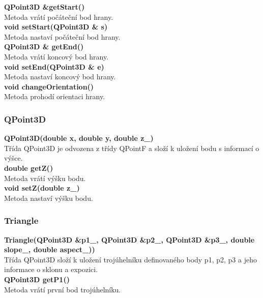 \documentclass[a4paper,11pt,twoside]{article}
\begin{document}
\noindent\textbf{QPoint3D \&getStart()}\\
Metoda vrátí počáteční bod hrany.\\

\noindent\textbf{void setStart(QPoint3D \& s)}\\
Metoda nastaví počáteční bod hrany.\\

\noindent\textbf{QPoint3D \& getEnd()}\\
Metoda vrátí koncový bod hrany.\\

\noindent\textbf{void setEnd(QPoint3D \& e)}\\
Metoda nastaví koncový bod hrany.\\

\noindent\textbf{void changeOrientation()}\\
Metoda prohodí orientaci hrany.

\subsubsection{QPoint3D}

\noindent\textbf{QPoint3D(double x, double y, double z\_)}\\
Třída QPoint3D je odvozena z třídy QPointF a složí k uložení bodu s informací o výšce.\\

\noindent\textbf{double getZ()}\\
Metoda vrátí výšku bodu.\\

\noindent\textbf{void setZ(double z\_)}\\
Metoda nastaví výšku bodu.

\newpage
\vspace*{-1cm}
\subsubsection{Triangle}

\noindent\textbf{Triangle(QPoint3D \&p1\_, QPoint3D \&p2\_, QPoint3D \&p3\_, double slope\_, double aspect\_))}\\
Třída QPoint3D složí k uložení trojúhelníku definovaného body p1, p2, p3 a jeho informace o sklonu a expozici.\\

\noindent\textbf{ QPoint3D getP1()}\\
Metoda vrátí první bod trojúhelníku.\\
\end{document}
